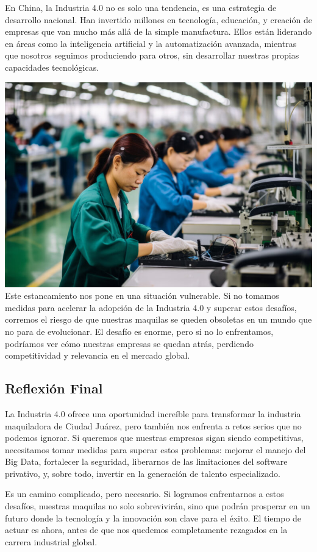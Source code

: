 \documentclass[
  10pt,
  letterpaper,
]{book}
\begin{document}
En China, la Industria 4.0 no es solo una tendencia, es una estrategia
de desarrollo nacional. Han invertido millones en tecnología, educación,
y creación de empresas que van mucho más allá de la simple manufactura.
Ellos están liderando en áreas como la inteligencia artificial y la
automatización avanzada, mientras que nosotros seguimos produciendo para
otros, sin desarrollar nuestras propias capacidades tecnológicas.

\includegraphics{Img/china.jpg} Este estancamiento nos pone en una
situación vulnerable. Si no tomamos medidas para acelerar la adopción de
la Industria 4.0 y superar estos desafíos, corremos el riesgo de que
nuestras maquilas se queden obsoletas en un mundo que no para de
evolucionar. El desafío es enorme, pero si no lo enfrentamos, podríamos
ver cómo nuestras empresas se quedan atrás, perdiendo competitividad y
relevancia en el mercado global.

\subsection{Reflexión Final}\label{reflexiuxf3n-final}

La Industria 4.0 ofrece una oportunidad increíble para transformar la
industria maquiladora de Ciudad Juárez, pero también nos enfrenta a
retos serios que no podemos ignorar. Si queremos que nuestras empresas
sigan siendo competitivas, necesitamos tomar medidas para superar estos
problemas: mejorar el manejo del Big Data, fortalecer la seguridad,
liberarnos de las limitaciones del software privativo, y, sobre todo,
invertir en la generación de talento especializado.

Es un camino complicado, pero necesario. Si logramos enfrentarnos a
estos desafíos, nuestras maquilas no solo sobrevivirán, sino que podrán
prosperar en un futuro donde la tecnología y la innovación son clave
para el éxito. El tiempo de actuar es ahora, antes de que nos quedemos
completamente rezagados en la carrera industrial global.
\end{document}
